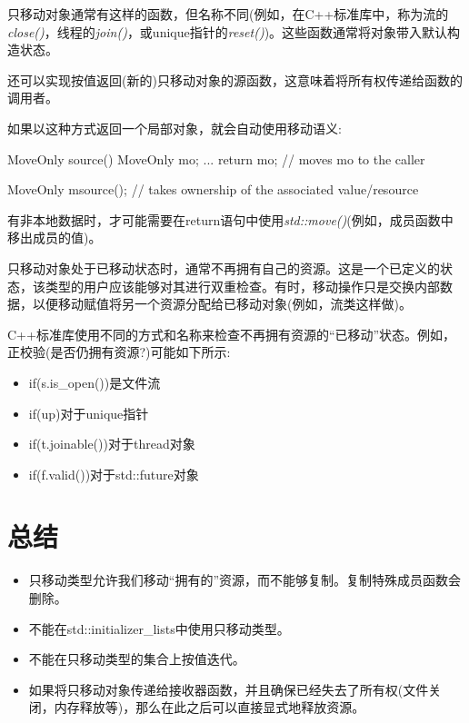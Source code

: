 只移动对象通常有这样的函数，但名称不同(例如，在C++标准库中，称为流的\textit{close()}，线程的\textit{join()}，或unique指针的\textit{reset()})。这些函数通常将对象带入默认构造状态。\par


还可以实现按值返回(新的)只移动对象的源函数，这意味着将所有权传递给函数的调用者。\par

如果以这种方式返回一个局部对象，就会自动使用移动语义:\par

\begin{codebox}[cpp]
MoveOnly source()
{
  MoveOnly mo;
  ...
  return mo; // moves mo to the caller
}

MoveOnly m{source()}; // takes ownership of the associated value/resource
\end{codebox}

有非本地数据时，才可能需要在return语句中使用\textit{std::move()}(例如，成员函数中移出成员的值)。\par


只移动对象处于已移动状态时，通常不再拥有自己的资源。这是一个已定义的状态，该类型的用户应该能够对其进行双重检查。有时，移动操作只是交换内部数据，以便移动赋值将另一个资源分配给已移动对象(例如，流类这样做)。\par

C++标准库使用不同的方式和名称来检查不再拥有资源的“已移动”状态。例如，正校验(是否仍拥有资源?)可能如下所示:\par

\begin{itemize}
  \item if(s.is\_open())是文件流
  \item if(up)对于unique指针
  \item if(t.joinable())对于thread对象
  \item if(f.valid())对于std::future对象
\end{itemize}


\section{总结}

\begin{itemize}
  \item 只移动类型允许我们移动“拥有的”资源，而不能够复制。复制特殊成员函数会删除。
  \item 不能在std::initializer\_lists中使用只移动类型。
  \item 不能在只移动类型的集合上按值迭代。
  \item 如果将只移动对象传递给接收器函数，并且确保已经失去了所有权(文件关闭，内存释放等)，那么在此之后可以直接显式地释放资源。
\end{itemize}
